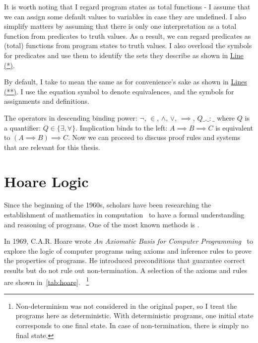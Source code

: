It is worth noting that I regard program states as total functions - I assume that we can assign some default values to variables in case they are undefined. 
I also simplify matters by assuming that there is only one interpretation as a total function from predicates to truth values. 
As a result, we can regard predicates as (total) functions from program states to truth values. 
I also overload the symbols for predicates and use them to identify the sets they describe as shown in \hyperlink{2.*}{Line (*)}. 

By default, I take  to mean the same as  for convenience's sake as shown in \hyperlink{2.**}{Lines (**)}. 
I use the equation symbol \mathl{=} to denote equivalences, and the symbols \mathl{:=} for assignments and definitions. 

The operators in descending binding power: $\neg$, $\in$, $\wedge$, $\vee$, ${\implies}$, $Q\_.\_:\_$ where $Q$ is a quantifier: $Q\in\{\exists, \forall\}$. Implication binds to the left: $A{\implies} B{\implies} C$ is equivalent to $(A{\implies} B){\implies} C$.
Now we can proceed to discuss proof rules and systems that are relevant for this thesis. 




\section{Hoare Logic}
Since the beginning of the 1960s, scholars have been researching the establishment of mathematics in computation~\cite{floyd93, mccarthy93} to have a formal understanding and reasoning of programs. 
One of the most known methods is . 

In 1969, C.A.R. Hoare wrote \textit{An Axiomatic Basis for Computer Programming}~\cite{hoare69} to explore the logic of computer programs using axioms and inference rules to prove the properties of programs. 
He introduced  preconditions that  guarantee correct results but do not rule out non-termination. 
A selection of the axioms and rules are shown in~\autoref{tab:hoare}.~
\footnote{Non-determinism was not considered in the original paper, so I treat the programs here as deterministic. 
With deterministic programs, one initial state corresponds to one final state.
In case of non-termination, there is simply no final state. }


